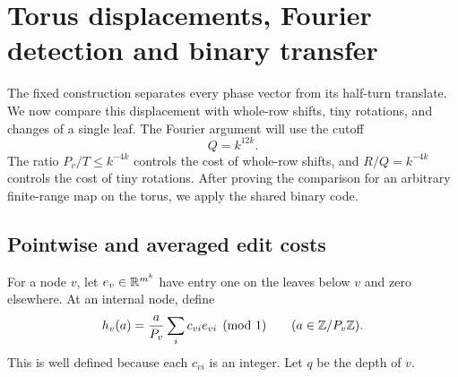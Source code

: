 \section{Torus displacements, Fourier detection and binary transfer}
\label{sec:torus-fourier}

The fixed construction separates every phase vector from its half-turn
translate. We now compare this displacement with whole-row shifts,
tiny rotations, and changes of a single leaf. The Fourier argument
will use the cutoff
\[
 Q=k^{12k}.
\]
The ratio $P_v/T\leq k^{-4k}$ controls the cost of whole-row shifts,
and $R/Q=k^{-4k}$ controls the cost of tiny rotations. After proving
the comparison for an arbitrary finite-range map on the torus, we
apply the shared binary code.

\subsection{Pointwise and averaged edit costs}

For a node $v$, let $e_v\in\mathbb R^{m^k}$ have entry one on the leaves below
$v$ and zero elsewhere. At an internal node, define
\begin{equation}\label{eq:cycle-shift}
 h_v(a)=\frac a{P_v}\sum_i c_{vi}e_{vi}\pmod1
 \qquad(a\in\mathbb Z/P_v\mathbb Z).
\end{equation}
This is well defined because each $c_{vi}$ is an integer. Let $q$ be
the depth of $v$.


